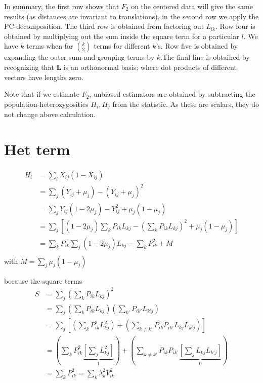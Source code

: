 \documentclass[10pt,a4paper]{article}
\newcommand{\ML}{\mathbf{L}} %
\begin{document}
In summary, the first row shows that $F_2$ on the centered data will give the same results (as distances are invariant to translations), in the second row we apply the PC-decomposition. The third row is obtained from factoring out $L_{lk}$. Row four is obtained by multiplying out the sum inside the square term for a particular $l$. We have $k$ terms when for $\binom{k}{2}$ terms for different $k$'s.  Row five is obtained by expanding the outer sum and grouping terms by $k$.The final line is obtained by recognizing that $\ML$ is an orthonormal basis; where dot products of different vectors have lengths zero.

Note that if we estimate $F_2$, unbiased estimators are obtained by subtracting the population-heterozygosities $H_i, H_j$ from the statistic. As these are scalars, they do not change above calculation.

\section{Het term}
\begin{align}
H_i &= \sum_l X_{ij} (1-X_{ij})\\
&= \sum_j (Y_{ij} + \mu_j) - (Y_{ij} + \mu_j)^2\\
&= \sum_j Y_{ij}(1-2\mu_j) - Y_{ij}^2 + \mu_j(1-\mu_j)\\
&= \sum_j \left[(1-2\mu_j)\sum_k P_{ik}L_{kj} - \left(\sum_k P_{ik}L_{kj}\right)^2 +  \mu_j(1-\mu_j)\right] \\
&= \sum_k P_{ik} \sum_j (1-2\mu_j)L_{kj} - \sum_k P_{ik}^2 + M \\
\end{align}
with $M= \sum_j \mu_j(1-\mu_j)$

because the square terms
\begin{align}
S &= \sum_j\left(\sum_k P_{ik}L_{kj}\right)^2 \\
&=  \sum_j \left(\sum_k P_{ik}L_{kj}\right)\left(\sum_{k'} P_{ik'}L_{k'j}\right)\\
&= \sum_j \left[\left(\sum_k P_{ik}^2L_{kj}^2\right) + \left(\sum_{k \neq k'} P_{ik} P_{ik'} L_{kj}L_{k'j}\right)\right]\\
&= \left(\sum_k P_{ik}^2 \underbrace{\left[ \sum_j L_{kj}^2\right]}_1 \right) + \left(\sum_{k \neq k'} P_{ik} P_{ik'} \underbrace{\left[ \sum_j L_{kj}L_{k'j} \right]}_0\right)\\
&= \sum_k P_{ik}^2 = \sum_k \lambda_k^2 V_{ik}^2
\end{align}



\end{document}

